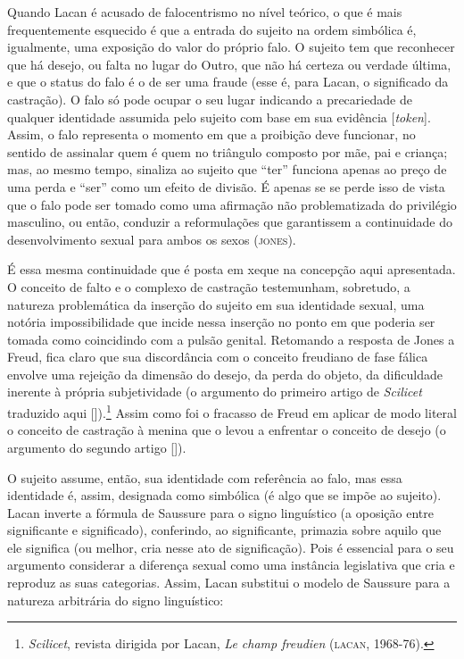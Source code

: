 Quando Lacan é acusado de falocentrismo no nível teórico, o que é mais
frequentemente esquecido é que a entrada do sujeito na ordem simbólica
é, igualmente, uma exposição do valor do próprio falo. O sujeito tem que
reconhecer que há desejo, ou falta no lugar do Outro, que não há certeza
ou verdade última, e que o status do falo é o de ser uma fraude (esse é,
para Lacan, o significado da castração). O falo só pode ocupar o seu
lugar indicando a precariedade de qualquer identidade assumida pelo
sujeito com base em sua evidência {[}\emph{token}{]}. Assim, o falo
representa o momento em que a proibição deve funcionar, no sentido de
assinalar quem é quem no triângulo composto por mãe, pai e criança; mas,
ao mesmo tempo, sinaliza ao sujeito que ``ter'' funciona apenas ao preço
de uma perda e ``ser'' como um efeito de divisão. É apenas se se perde
isso de vista que o falo pode ser tomado como uma afirmação não
problematizada do privilégio masculino, ou então, conduzir a
reformulações que garantissem a continuidade do desenvolvimento sexual
para ambos os sexos (\textsc{jones}). %

É essa mesma continuidade que é posta em xeque na concepção aqui
apresentada. O conceito de falto e o complexo de castração testemunham, %
sobretudo, a natureza problemática da inserção do sujeito em sua
identidade sexual, uma notória impossibilidade que incide nessa inserção
no ponto em que poderia ser tomada como coincidindo com a pulsão
genital. Retomando a resposta de Jones a Freud, fica claro que sua
discordância com o conceito freudiano de fase fálica envolve uma
rejeição da dimensão do desejo, da perda do objeto, da dificuldade
inerente à própria subjetividade (o argumento do primeiro artigo de
\emph{Scilicet} traduzido aqui []).\footnote{\emph{Scilicet}, revista
  dirigida por Lacan, \emph{Le champ freudien} (\textsc{lacan}, 1968-76).} Assim
como foi o fracasso de Freud em aplicar de modo literal o conceito de
castração à menina que o levou a enfrentar o conceito de desejo (o
argumento do segundo artigo []).

O sujeito assume, então, sua identidade com referência ao falo, mas essa
identidade é, assim, designada como simbólica (é algo que se impõe ao
sujeito). Lacan inverte a fórmula de Saussure para o signo linguístico
(a oposição entre significante e significado), conferindo, ao
significante, primazia sobre aquilo que ele significa (ou melhor, cria
nesse ato de significação). Pois é essencial para o seu argumento
considerar a diferença sexual como uma instância legislativa que cria e
reproduz as suas categorias. Assim, Lacan substitui o modelo de Saussure
para a natureza arbitrária do signo linguístico:


